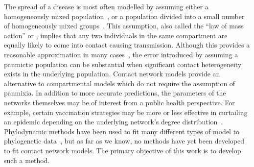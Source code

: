 
The spread of a disease is most often modelled by assuming either a
homogeneously mixed population~\autocite{hamer1906milroy,
kermack1927contribution}, or a population divided into a small number of
homogeneously mixed groups~\autocite{rushton1955deterministic}. This
assumption, also called the ``law of mass action'' or , implies
that any two individuals in the same compartment are equally likely to come
into contact causing transmission. Although this provides a reasonable
approximation in many cases~\autocite{anderson1992infectious}, the error
introduced by assuming a panmictic population can be substantial when
significant contact heterogeneity exists in the underlying population. Contact
network models provide an alternative to compartmental models which do not
require the assumption of panmixia. In addition to more accurate predictions,
the parameters of the networks themselves may be of interest from a public
health perspective. For example, certain vaccination strategies may be more or
less effective in curtailing an epidemic depending on the underlying network's
degree distribution~\autocite{peng2013vaccination, ma2013importance}.
Phylodynamic methods have been used to fit many different types of model to
phylogenetic data~\autocite{pybus2009evolutionary,volz2013viral}, but as far as
we know, no methods have yet been developed to fit contact network models. The
primary objective of this work is to develop such a method.

\newcommand{\G}{\mathcal{G}}
\newcommand{\Nu}{\mathcal{N}}

